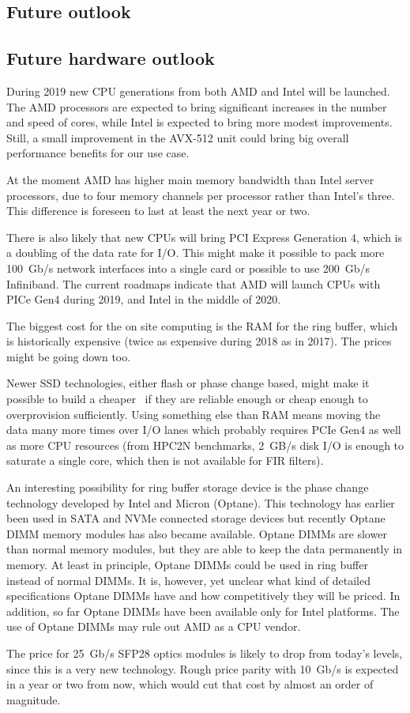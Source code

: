\documentclass[12pt,a4paper]{article}
\begin{document}
\begin{appendices}
\section{Future outlook}
\subsection*{Future hardware outlook}

During 2019 new CPU generations from both AMD and Intel will be launched. The AMD processors are expected to bring significant increases in the number and speed of cores, while Intel is expected to bring more modest improvements. Still, a small improvement in the AVX-512 unit could bring big overall performance benefits for our use case.

At the moment AMD has higher main memory bandwidth than Intel server processors, due to four memory channels per processor rather than Intel's three. This difference is foreseen to last at least the next year or two. 

There is also likely that new CPUs will bring PCI Express Generation 4, which is a doubling of the data rate for I/O. This might make it possible to pack more 100~Gb/s network interfaces into a single card or possible to use 200~Gb/s Infiniband. The current roadmaps indicate that AMD will launch CPUs with PICe Gen4 during 2019, and Intel in the middle of 2020.

The biggest cost for the on site computing is the RAM for the ring buffer, which is historically expensive (twice as expensive during 2018 as in 2017). The prices might be going down too.

Newer SSD technologies, either flash or phase change based, might make it possible to build a cheaper \RB\ if they are reliable enough or cheap enough to overprovision sufficiently. Using something else than RAM means moving the data many more times over I/O lanes which probably requires PCIe Gen4 as well as more CPU resources (from HPC2N benchmarks, 2~GB/s disk I/O is enough to saturate a single core, which then is not available for FIR filters).

An interesting possibility for ring buffer storage device is the phase change technology developed by Intel and Micron (Optane\texttrademark). This technology has earlier been used in SATA and NVMe connected storage devices but recently Optane DIMM memory modules has also became available. Optane DIMMs are slower than normal memory modules, but they are able to keep the data permanently in memory. At least in principle, Optane DIMMs could be used in ring buffer instead of normal DIMMs. It is, however, yet unclear what kind of detailed specifications Optane DIMMs have and how competitively they will be priced. In addition, so far Optane DIMMs have been available only for Intel platforms. The use of Optane DIMMs may rule out AMD as a CPU vendor.

The price for 25~Gb/s SFP28 optics modules is likely to drop from today's levels, since this is a very new technology. Rough price parity with 10~Gb/s is expected in a year or two from now, which would cut that cost by almost an order of magnitude.
\end{appendices}
\end{document}
